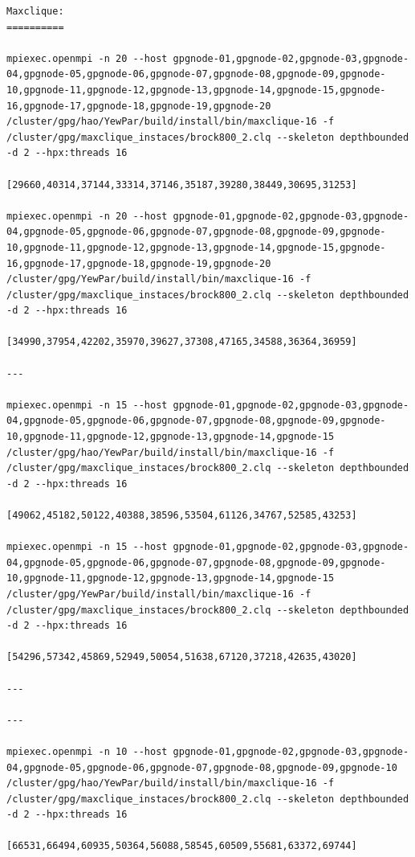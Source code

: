 \documentclass{mproj}
\begin{document}
\begin{lstlisting}
Maxclique:
==========

mpiexec.openmpi -n 20 --host gpgnode-01,gpgnode-02,gpgnode-03,gpgnode-04,gpgnode-05,gpgnode-06,gpgnode-07,gpgnode-08,gpgnode-09,gpgnode-10,gpgnode-11,gpgnode-12,gpgnode-13,gpgnode-14,gpgnode-15,gpgnode-16,gpgnode-17,gpgnode-18,gpgnode-19,gpgnode-20 /cluster/gpg/hao/YewPar/build/install/bin/maxclique-16 -f /cluster/gpg/maxclique_instaces/brock800_2.clq --skeleton depthbounded -d 2 --hpx:threads 16

[29660,40314,37144,33314,37146,35187,39280,38449,30695,31253]

mpiexec.openmpi -n 20 --host gpgnode-01,gpgnode-02,gpgnode-03,gpgnode-04,gpgnode-05,gpgnode-06,gpgnode-07,gpgnode-08,gpgnode-09,gpgnode-10,gpgnode-11,gpgnode-12,gpgnode-13,gpgnode-14,gpgnode-15,gpgnode-16,gpgnode-17,gpgnode-18,gpgnode-19,gpgnode-20 /cluster/gpg/YewPar/build/install/bin/maxclique-16 -f /cluster/gpg/maxclique_instaces/brock800_2.clq --skeleton depthbounded -d 2 --hpx:threads 16

[34990,37954,42202,35970,39627,37308,47165,34588,36364,36959]

---

mpiexec.openmpi -n 15 --host gpgnode-01,gpgnode-02,gpgnode-03,gpgnode-04,gpgnode-05,gpgnode-06,gpgnode-07,gpgnode-08,gpgnode-09,gpgnode-10,gpgnode-11,gpgnode-12,gpgnode-13,gpgnode-14,gpgnode-15 /cluster/gpg/hao/YewPar/build/install/bin/maxclique-16 -f /cluster/gpg/maxclique_instaces/brock800_2.clq --skeleton depthbounded -d 2 --hpx:threads 16

[49062,45182,50122,40388,38596,53504,61126,34767,52585,43253]

mpiexec.openmpi -n 15 --host gpgnode-01,gpgnode-02,gpgnode-03,gpgnode-04,gpgnode-05,gpgnode-06,gpgnode-07,gpgnode-08,gpgnode-09,gpgnode-10,gpgnode-11,gpgnode-12,gpgnode-13,gpgnode-14,gpgnode-15 /cluster/gpg/YewPar/build/install/bin/maxclique-16 -f /cluster/gpg/maxclique_instaces/brock800_2.clq --skeleton depthbounded -d 2 --hpx:threads 16

[54296,57342,45869,52949,50054,51638,67120,37218,42635,43020]

---

---

mpiexec.openmpi -n 10 --host gpgnode-01,gpgnode-02,gpgnode-03,gpgnode-04,gpgnode-05,gpgnode-06,gpgnode-07,gpgnode-08,gpgnode-09,gpgnode-10 /cluster/gpg/hao/YewPar/build/install/bin/maxclique-16 -f /cluster/gpg/maxclique_instaces/brock800_2.clq --skeleton depthbounded -d 2 --hpx:threads 16

[66531,66494,60935,50364,56088,58545,60509,55681,63372,69744]


\end{lstlisting}
\end{document}
